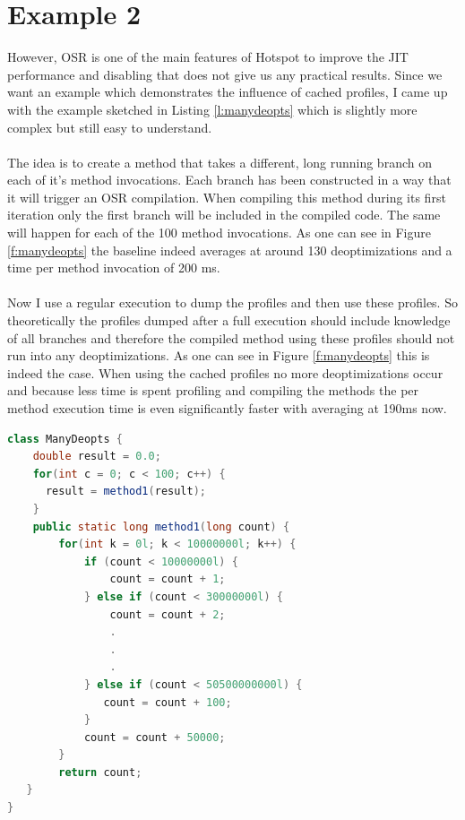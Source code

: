 \section{Example 2}
\label{s:ex2}
However, OSR is one of the main features of Hotspot to improve the JIT performance and disabling that does not give us any practical results. Since we want an example which demonstrates the influence of cached profiles, I came up with the example sketched in Listing \ref{l:manydeopts} which is slightly more complex but still easy to understand.
\\\\
The idea is to create a method that takes a different, long running branch on each of it's method invocations. Each branch has been constructed in a way that it will trigger an OSR compilation. When compiling this method during its first iteration only the first branch will be included in the compiled code. The same will happen for each of the 100 method invocations. As one can see in Figure \ref{f:manydeopts} the baseline indeed averages at around 130 deoptimizations and a time per method invocation of 200 ms.
\\\\
Now I use a regular execution to dump the profiles and then use these profiles. So theoretically the profiles dumped after a full execution should include knowledge of all branches and therefore the compiled method using these profiles should not run into any deoptimizations. As one can see in Figure \ref{f:manydeopts} this is indeed the case. When using the cached profiles no more deoptimizations occur and because less time is spent profiling and compiling the methods the per method execution time is even significantly faster with averaging at 190ms now.
\begin{lstlisting}[float,caption=Simple method that causes many deoptimizations,label=l:manydeopts,language=Java]
class ManyDeopts {
    double result = 0.0;
    for(int c = 0; c < 100; c++) {
      result = method1(result);
    }
    public static long method1(long count) {
        for(int k = 0l; k < 10000000l; k++) {
            if (count < 10000000l) {
                count = count + 1;
            } else if (count < 30000000l) {
                count = count + 2;
                .
                .
                .
            } else if (count < 50500000000l) {
               count = count + 100;
            }
            count = count + 50000;
        }
        return count;
   }
}
\end{lstlisting}
\\\\\\\\\\\\
